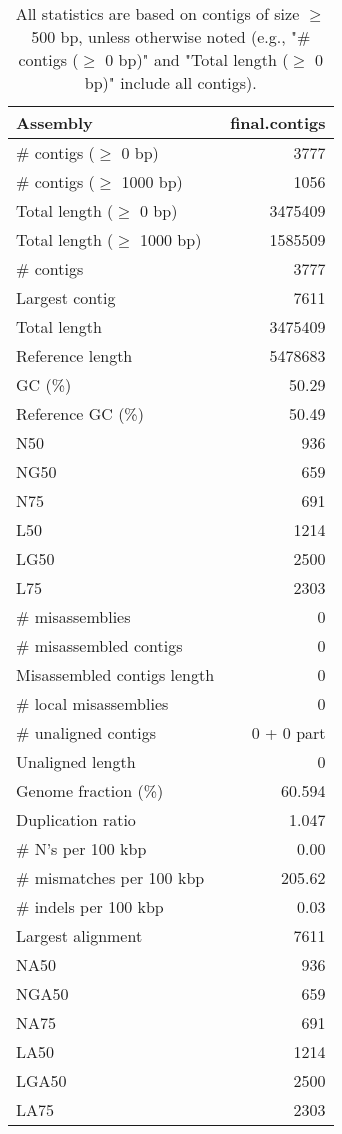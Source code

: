 \documentclass[12pt,a4paper]{article}
\begin{document}
\begin{table}[ht]
\begin{center}
\caption{All statistics are based on contigs of size $\geq$ 500 bp, unless otherwise noted (e.g., "\# contigs ($\geq$ 0 bp)" and "Total length ($\geq$ 0 bp)" include all contigs).}
\begin{tabular}{|l*{1}{|r}|}
\hline
Assembly & final.contigs \\ \hline
\# contigs ($\geq$ 0 bp) & 3777 \\ \hline
\# contigs ($\geq$ 1000 bp) & 1056 \\ \hline
Total length ($\geq$ 0 bp) & 3475409 \\ \hline
Total length ($\geq$ 1000 bp) & 1585509 \\ \hline
\# contigs & 3777 \\ \hline
Largest contig & 7611 \\ \hline
Total length & 3475409 \\ \hline
Reference length & 5478683 \\ \hline
GC (\%) & 50.29 \\ \hline
Reference GC (\%) & 50.49 \\ \hline
N50 & 936 \\ \hline
NG50 & 659 \\ \hline
N75 & 691 \\ \hline
L50 & 1214 \\ \hline
LG50 & 2500 \\ \hline
L75 & 2303 \\ \hline
\# misassemblies & 0 \\ \hline
\# misassembled contigs & 0 \\ \hline
Misassembled contigs length & 0 \\ \hline
\# local misassemblies & 0 \\ \hline
\# unaligned contigs & 0 + 0 part \\ \hline
Unaligned length & 0 \\ \hline
Genome fraction (\%) & 60.594 \\ \hline
Duplication ratio & 1.047 \\ \hline
\# N's per 100 kbp & 0.00 \\ \hline
\# mismatches per 100 kbp & 205.62 \\ \hline
\# indels per 100 kbp & 0.03 \\ \hline
Largest alignment & 7611 \\ \hline
NA50 & 936 \\ \hline
NGA50 & 659 \\ \hline
NA75 & 691 \\ \hline
LA50 & 1214 \\ \hline
LGA50 & 2500 \\ \hline
LA75 & 2303 \\ \hline
\end{tabular}
\end{center}
\end{table}
\end{document}
